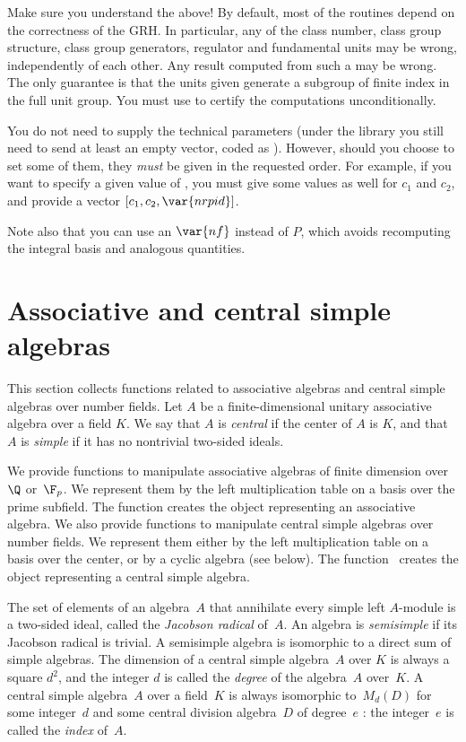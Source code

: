  Make sure you understand the above! By default, most of
the  routines depend on the correctness of the GRH. In particular,
any of the class number, class group structure, class group generators,
regulator and fundamental units may be wrong, independently of each other.
Any result computed from such a  may be wrong. The only guarantee is
that the units given generate a subgroup of finite index in the full unit
group. You must use  to certify the computations
unconditionally.


You do not need to supply the technical parameters (under the library you
still need to send at least an empty vector, coded as ). However,
should you choose to set some of them, they \emph{must} be given in the
requested order. For example, if you want to specify a given value of
, you must give some values as well for $c_1$ and $c_2$, and provide
a vector $[c_1,c_2,\var{nrpid}]$.

Note also that you can use an $\var{nf}$ instead of $P$, which avoids
recomputing the integral basis and analogous quantities.

\smallskip


\section{Associative and central simple algebras}

This section collects functions related to associative algebras and central
simple algebras over number fields. Let $A$ be a finite-dimensional unitary
associative algebra over a field $K$. We say that $A$ is \emph{central} if
the center of $A$ is $K$, and that $A$ is \emph{simple} if it has no
nontrivial two-sided ideals.

We provide functions to manipulate associative algebras of finite
dimension over~$\Q$ or~$\F_p$. We represent them by the left multiplication
table on a basis over the prime subfield. The function 
creates the object representing an associative algebra. We also provide
functions to manipulate central simple algebras over number fields. We
represent them either by the left multiplication table on a basis over the
center, or by a cyclic algebra (see below). The function~ creates
the object representing a central simple algebra.

The set of elements of an algebra~$A$ that annihilate every simple left
$A$-module is a two-sided ideal, called the \emph{Jacobson radical} of~$A$.
An algebra is \emph{semisimple} if its Jacobson radical is trivial. A
semisimple algebra is isomorphic to a direct sum of simple algebras. The
dimension of a central simple algebra~$A$ over $K$ is always a square $d^2$,
and the integer $d$ is called the \emph{degree} of the algebra~$A$ over~$K$.
A central simple algebra~$A$ over a field~$K$ is always isomorphic to~$M_d(D)$
for some integer~$d$ and some central division algebra~$D$ of degree~$e$ : the
integer~$e$ is called the \emph{index} of~$A$.


